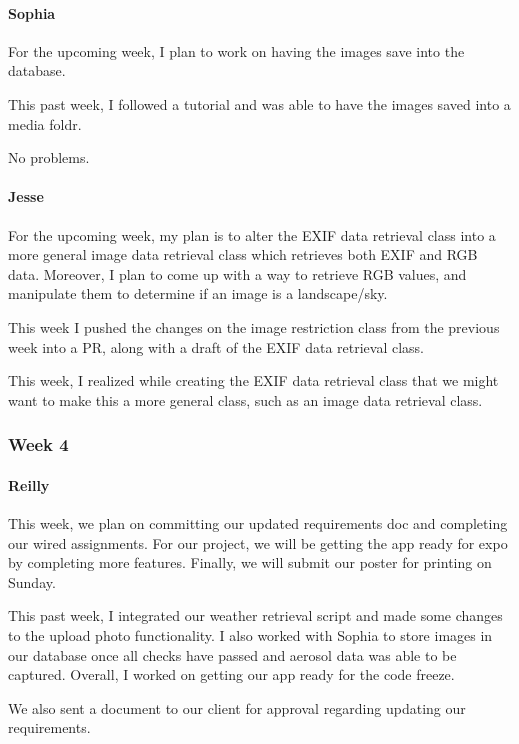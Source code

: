\documentclass[onecolumn, draftclsnofoot,10pt, compsoc]{IEEEtran}
\begin{document}
\begin{flushleft}
\paragraph{Sophia}
 
For the upcoming week, I plan to work on having the images save into the database.
 
 
This past week, I followed a tutorial and was able to have the images saved into a media foldr.
 
 
No problems.
 
\paragraph{Jesse}
 
For the upcoming week, my plan is to alter the EXIF data retrieval class into a more general image data retrieval class which retrieves both EXIF and RGB data. Moreover, I plan to come up with a way to retrieve RGB values, and manipulate them to determine if an image is a landscape/sky.
 
 
This week I pushed the changes on the image restriction class from the previous week into a PR, along with a draft of the EXIF data retrieval class.
 
 
This week, I realized while creating the EXIF data retrieval class that we might want to make this a more general class, such as an image data retrieval class.
 
\subsubsection{Week 4}
\paragraph{Reilly}
 
This week, we plan on committing our updated requirements doc and completing our wired assignments. For our project, we will be getting the app ready for expo by completing more features. Finally, we will submit our poster for printing on Sunday.
 
 
This past week, I integrated our weather retrieval script and made some changes to the upload photo functionality. I also worked with Sophia to store images in our database once all checks have passed and aerosol data was able to be captured. Overall, I worked on getting our app ready for the code freeze.
 
We also sent a document to our client for approval regarding updating our requirements.
 

\end{flushleft}
\end{document}
